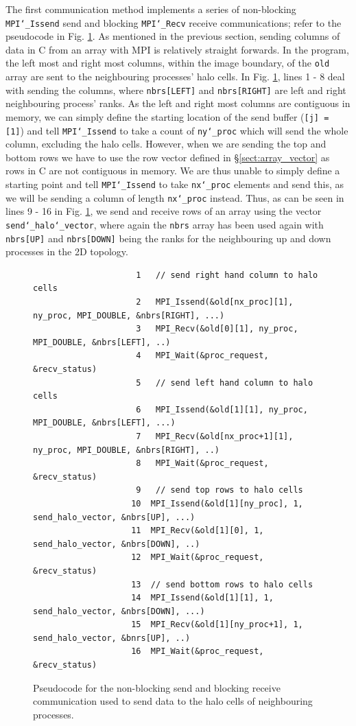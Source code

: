 \documentclass[11pt, a4paper]{article}
\begin{document}
			The first communication method implements a series of non-blocking \texttt{MPI\char`_Issend} send and blocking \texttt{MPI\char`_Recv} receive communications; refer to the pseudocode in Fig. \ref{fig:communication}. As mentioned in the previous section, sending columns of data in C from an array with MPI is relatively straight forwards. In the program, the left most and right most columns, within the image boundary, of the \texttt{old} array are sent to the neighbouring processes' halo cells. In Fig. \ref{fig:communication}, lines 1 - 8 deal with sending the columns, where \texttt{nbrs[LEFT]} and \texttt{nbrs[RIGHT]} are left and right neighbouring process' ranks. As the left and right most columns are contiguous in memory, we can simply define the starting location of the send buffer (\texttt{[j] = [1]}) and tell \texttt{MPI\char`_Issend} to take a count of \texttt{ny\char`_proc} which will send the whole column, excluding the halo cells. However, when we are sending the top and bottom rows we have to use the row vector defined in \S\ref{sect:array_vector} as rows in C are not contiguous in memory. We are thus unable to simply define a starting point and tell \texttt{MPI\char`_Issend} to take \texttt{nx\char`_proc} elements and send this, as we will be sending a column of length \texttt{nx\char`_proc} instead. Thus, as can be seen in lines 9 - 16 in Fig. \ref{fig:communication}, we send and receive rows of an array using the vector \texttt{send\char`_halo\char`_vector}, where again the \texttt{nbrs} array has been used again with \texttt{nbrs[UP]} and \texttt{nbrs[DOWN]} being the ranks for the neighbouring up and down processes in the 2D topology.
						
			\begin{figure}
				\begin{verbatim}
					 1	 // send right hand column to halo cells
					 2	 MPI_Issend(&old[nx_proc][1], ny_proc, MPI_DOUBLE, &nbrs[RIGHT], ...)
					 3	 MPI_Recv(&old[0][1], ny_proc, MPI_DOUBLE, &nbrs[LEFT], ..)
					 4	 MPI_Wait(&proc_request, &recv_status)
					 5	 // send left hand column to halo cells
					 6	 MPI_Issend(&old[1][1], ny_proc, MPI_DOUBLE, &nbrs[LEFT], ...)
					 7	 MPI_Recv(&old[nx_proc+1][1], ny_proc, MPI_DOUBLE, &nbrs[RIGHT], ..)
					 8	 MPI_Wait(&proc_request, &recv_status)		
					 9	 // send top rows to halo cells
					10	MPI_Issend(&old[1][ny_proc], 1, send_halo_vector, &nbrs[UP], ...)
					11	MPI_Recv(&old[1][0], 1, send_halo_vector, &nbrs[DOWN], ..)
					12	MPI_Wait(&proc_request, &recv_status)
					13	// send bottom rows to halo cells
					14	MPI_Issend(&old[1][1], 1, send_halo_vector, &nbrs[DOWN], ...)
					15	MPI_Recv(&old[1][ny_proc+1], 1, send_halo_vector, &bnrs[UP], ..)
					16	MPI_Wait(&proc_request, &recv_status)		
				\end{verbatim}
				\caption{Pseudocode for the non-blocking send and blocking receive communication used to send data to the halo cells of neighbouring processes.}
				\label{fig:communication}
			\end{figure}
			
\end{document}
